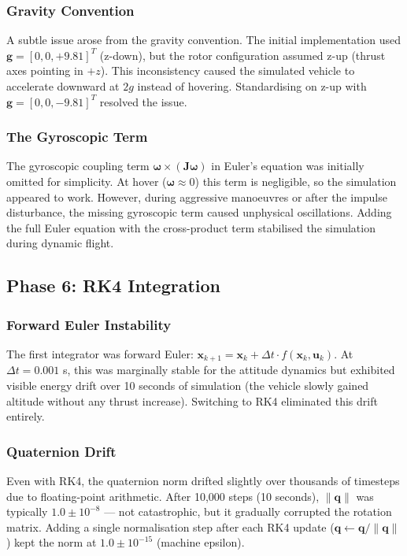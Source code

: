 \documentclass[12pt, a4paper]{article}
\newcommand{\bx}{\bm{x}}
\newcommand{\bu}{\bm{u}}
\newcommand{\bq}{\bm{q}}
\newcommand{\bomega}{\bm{\omega}}
\newcommand{\bJ}{\bm{J}}
\begin{document}
\subsubsection{Gravity Convention}

A subtle issue arose from the gravity convention.  The initial implementation used $\bm{g} = [0, 0, +9.81]^T$ (z-down), but the rotor configuration assumed z-up (thrust axes pointing in $+z$).  This inconsistency caused the simulated vehicle to accelerate downward at $2g$ instead of hovering.  Standardising on z-up with $\bm{g} = [0, 0, -9.81]^T$ resolved the issue.

\subsubsection{The Gyroscopic Term}

The gyroscopic coupling term $\bomega \times (\bJ \bomega)$ in Euler's equation was initially omitted for simplicity.  At hover ($\bomega \approx 0$) this term is negligible, so the simulation appeared to work.  However, during aggressive manoeuvres or after the impulse disturbance, the missing gyroscopic term caused unphysical oscillations.  Adding the full Euler equation with the cross-product term stabilised the simulation during dynamic flight.

\subsection{Phase 6: RK4 Integration}

\subsubsection{Forward Euler Instability}

The first integrator was forward Euler: $\bx_{k+1} = \bx_k + \Delta t \cdot f(\bx_k, \bu_k)$.  At $\Delta t = 0.001$ s, this was marginally stable for the attitude dynamics but exhibited visible energy drift over 10 seconds of simulation (the vehicle slowly gained altitude without any thrust increase).  Switching to RK4 eliminated this drift entirely.

\subsubsection{Quaternion Drift}

Even with RK4, the quaternion norm drifted slightly over thousands of timesteps due to floating-point arithmetic.  After 10{,}000 steps (10 seconds), $\|\bq\|$ was typically $1.0 \pm 10^{-8}$ --- not catastrophic, but it gradually corrupted the rotation matrix.  Adding a single normalisation step after each RK4 update ($\bq \leftarrow \bq / \|\bq\|$) kept the norm at $1.0 \pm 10^{-15}$ (machine epsilon).
\end{document}
